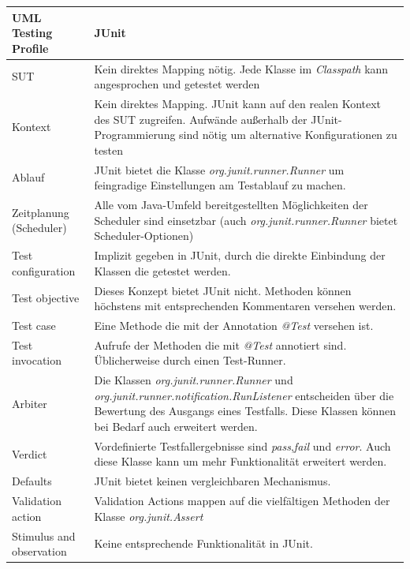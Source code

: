 \begin{table}[h]
\centering
\begin{tabular}
{ | l |p{9cm}|} \hline
\textbf{UML Testing Profile} & \textbf{JUnit} \\ \hline \Gls{SUT}                       & Kein direktes Mapping nötig. Jede Klasse im \textit{Classpath} kann angesprochen und getestet werden   \\ \hline
Kontext                   & Kein direktes Mapping. JUnit kann auf den realen Kontext des \Gls{SUT} zugreifen. Aufwände außerhalb der JUnit-Programmierung sind nötig um alternative Konfigurationen zu testen \\ \hline
Ablauf         			  & JUnit bietet die Klasse \textit{org.junit.runner.Runner} um feingradige Einstellungen am Testablauf zu machen. \\ \hline
Zeitplanung (Scheduler)   & Alle vom Java-Umfeld bereitgestellten Möglichkeiten der Scheduler sind einsetzbar (auch \textit{org.junit.runner.Runner} bietet Scheduler-Optionen) \\ \hline
Test configuration        & Implizit gegeben in JUnit, durch die direkte Einbindung der Klassen die getestet werden. \\ \hline
Test objective            & Dieses Konzept bietet JUnit nicht. Methoden können höchstens mit entsprechenden Kommentaren versehen werden.\\ \hline
Test case                 & Eine Methode die mit der Annotation \textit{@Test} versehen ist. \\ \hline
Test invocation           & Aufrufe der Methoden die mit \textit{@Test} annotiert sind. Üblicherweise durch einen Test-Runner. \\ \hline
Arbiter                   & Die Klassen \textit{org.junit.runner.Runner} und \textit{org.junit.runner.notification.RunListener} entscheiden über die Bewertung des Ausgangs eines Testfalls. Diese Klassen können bei Bedarf auch erweitert werden. \\ \hline
Verdict                   & Vordefinierte Testfallergebnisse sind \textit{pass},\textit{fail} und \textit{error}. Auch diese Klasse kann um mehr Funktionalität erweitert werden. \\ \hline
Defaults                  & JUnit bietet keinen vergleichbaren Mechanismus.  \\ \hline
Validation action         & Validation Actions mappen auf die vielfältigen Methoden der Klasse \textit{org.junit.Assert} \\ \hline
Stimulus and observation  & Keine entsprechende Funktionalität in JUnit. \\ \hline

\end{tabular}
\end{table}
